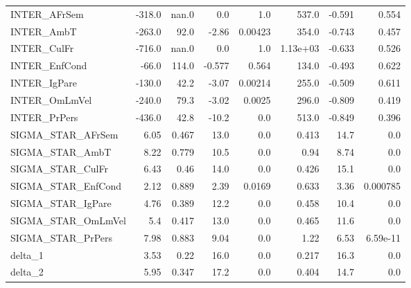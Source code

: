 \begin{tabular}{lrrrrrrr}
INTER\_AFrSem       &   -318.0 &    nan.0 &     0.0 &      1.0 &         537.0 &       -0.591 &         0.554 \\
INTER\_AmbT         &   -263.0 &     92.0 &   -2.86 &  0.00423 &         354.0 &       -0.743 &         0.457 \\
INTER\_CulFr        &   -716.0 &    nan.0 &     0.0 &      1.0 &      1.13e+03 &       -0.633 &         0.526 \\
INTER\_EnfCond      &    -66.0 &    114.0 &  -0.577 &    0.564 &         134.0 &       -0.493 &         0.622 \\
INTER\_IgPare       &   -130.0 &     42.2 &   -3.07 &  0.00214 &         255.0 &       -0.509 &         0.611 \\
INTER\_OmLmVel      &   -240.0 &     79.3 &   -3.02 &   0.0025 &         296.0 &       -0.809 &         0.419 \\
INTER\_PrPers       &   -436.0 &     42.8 &   -10.2 &      0.0 &         513.0 &       -0.849 &         0.396 \\
SIGMA\_STAR\_AFrSem  &     6.05 &    0.467 &    13.0 &      0.0 &         0.413 &         14.7 &           0.0 \\
SIGMA\_STAR\_AmbT    &     8.22 &    0.779 &    10.5 &      0.0 &          0.94 &         8.74 &           0.0 \\
SIGMA\_STAR\_CulFr   &     6.43 &     0.46 &    14.0 &      0.0 &         0.426 &         15.1 &           0.0 \\
SIGMA\_STAR\_EnfCond &     2.12 &    0.889 &    2.39 &   0.0169 &         0.633 &         3.36 &      0.000785 \\
SIGMA\_STAR\_IgPare  &     4.76 &    0.389 &    12.2 &      0.0 &         0.458 &         10.4 &           0.0 \\
SIGMA\_STAR\_OmLmVel &      5.4 &    0.417 &    13.0 &      0.0 &         0.465 &         11.6 &           0.0 \\
SIGMA\_STAR\_PrPers  &     7.98 &    0.883 &    9.04 &      0.0 &          1.22 &         6.53 &      6.59e-11 \\
delta\_1            &     3.53 &     0.22 &    16.0 &      0.0 &         0.217 &         16.3 &           0.0 \\
delta\_2            &     5.95 &    0.347 &    17.2 &      0.0 &         0.404 &         14.7 &           0.0 \\
\bottomrule
\end{tabular}

